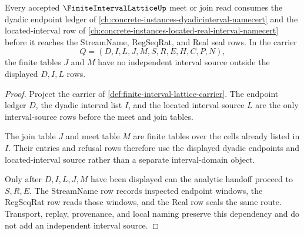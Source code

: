 \begin{theorem}
\label{thm:finite-interval-lattice-dyadic-interval-dependency}
Every accepted $\FiniteIntervalLatticeUp$ meet or join read consumes the dyadic endpoint ledger of \autoref{ch:concrete-instances-dyadicinterval-namecert} and the located-interval row of \autoref{ch:concrete-instances-located-real-interval-namecert} before it reaches the StreamName, RegSeqRat, and Real seal rows. In the carrier
$$
Q=(D,I,L,J,M,S,R,E,H,C,P,N),
$$
the finite tables $J$ and $M$ have no independent interval source outside the displayed $D,I,L$ rows.
\end{theorem}
\begin{proof}
Project the carrier of \autoref{def:finite-interval-lattice-carrier}. The endpoint ledger $D$, the dyadic interval list $I$, and the located interval source $L$ are the only interval-source rows before the meet and join tables.

The join table $J$ and meet table $M$ are finite tables over the cells already listed in $I$. Their entries and refusal rows therefore use the displayed dyadic endpoints and located-interval source rather than a separate interval-domain object.

Only after $D,I,L,J,M$ have been displayed can the analytic handoff proceed to $S,R,E$. The StreamName row records inspected endpoint windows, the RegSeqRat row reads those windows, and the Real row seals the same route. Transport, replay, provenance, and local naming preserve this dependency and do not add an independent interval source.
\end{proof}
